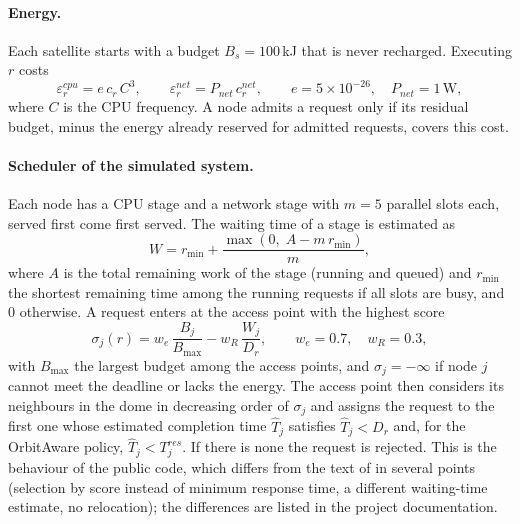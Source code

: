 \paragraph{Energy.}
Each satellite starts with a budget $B_s = 100$\,kJ that is never recharged. Executing $r$ costs
\citep[Eq.~6.3]{magliarisi2026thesis}
\begin{equation}
  \varepsilon^{cpu}_r = e\,c_r\,C^3, \qquad \varepsilon^{net}_r = P_{net}\,c^{net}_r,
  \qquad e = 5\times10^{-26},\quad P_{net} = 1\,\text{W},
\end{equation}
where $C$ is the CPU frequency. A node admits a request only if its residual budget, minus the
energy already reserved for admitted requests, covers this cost.

\paragraph{Scheduler of the simulated system.}
Each node has a CPU stage and a network stage with $m = 5$ parallel slots each, served first come
first served. The waiting time of a stage is estimated as
\begin{equation}
  W = r_{\min} + \frac{\max(0,\; A - m\,r_{\min})}{m},
\end{equation}
where $A$ is the total remaining work of the stage (running and queued) and $r_{\min}$ the
shortest remaining time among the running requests if all slots are busy, and $0$ otherwise. A
request enters at the access point with the highest score
\begin{equation}
  \sigma_j(r) = w_e\,\frac{B_j}{B_{\max}} - w_R\,\frac{W_j}{D_r}, \qquad w_e = 0.7,\quad w_R = 0.3,
\end{equation}
with $B_{\max}$ the largest budget among the access points, and $\sigma_j = -\infty$ if node $j$
cannot meet the deadline or lacks the energy. The access point then considers its neighbours in
the dome in decreasing order of $\sigma_j$ and assigns the request to the first one whose
estimated completion time $\hat T_j$ satisfies $\hat T_j < D_r$ and, for the OrbitAware policy,
$\hat T_j < T^{res}_j$. If there is none the request is rejected. This is the behaviour of the
public code, which differs from the text of \citet[Section~6.3.1]{magliarisi2026thesis} in several
points (selection by score instead of minimum response time, a different waiting-time estimate, no
relocation); the differences are listed in the project documentation.

